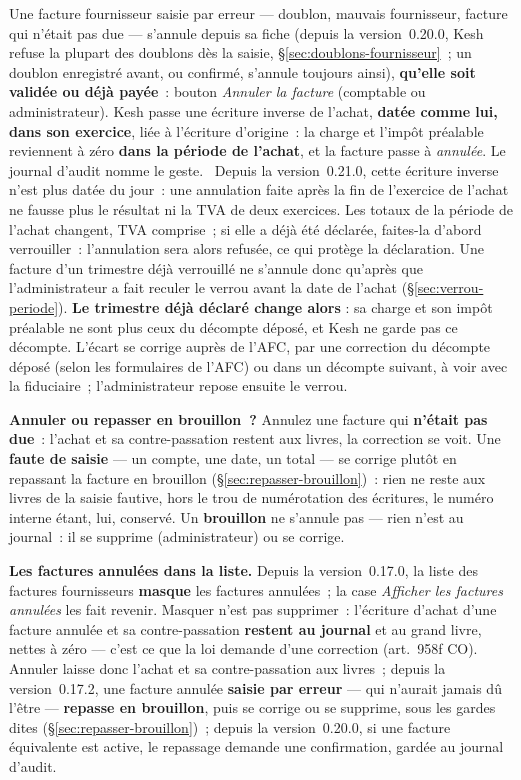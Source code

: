 \documentclass[a4paper,11pt,oneside]{article}
\begin{document}
Une facture fournisseur saisie par erreur --- doublon, mauvais fournisseur, facture qui n'était
pas due --- s'annule depuis sa fiche (depuis la version~0.20.0, Kesh refuse la plupart des
doublons dès la saisie, \S\ref{sec:doublons-fournisseur}~; un doublon enregistré avant, ou
confirmé, s'annule toujours ainsi), \textbf{qu'elle soit validée ou déjà payée}~: bouton
\emph{Annuler la facture} (comptable ou administrateur). Kesh passe une écriture inverse de
l'achat, \textbf{datée comme lui, dans son exercice}, liée à l'écriture d'origine~: la charge et
l'impôt préalable reviennent à zéro \textbf{dans la période de l'achat}, et la facture passe à
\emph{annulée}. Le journal d'audit nomme le geste. \keshAttention\ Depuis la version~0.21.0, cette
écriture inverse n'est plus datée du jour~: une annulation faite après la fin de l'exercice de
l'achat ne fausse plus le résultat ni la TVA de deux exercices. Les totaux de la période de l'achat
changent, TVA comprise~; si elle a déjà été déclarée, faites-la d'abord verrouiller~: l'annulation
sera alors refusée, ce qui protège la déclaration. Une facture d'un trimestre déjà verrouillé ne
s'annule donc qu'après que l'administrateur a fait reculer le verrou avant la date de l'achat
(\S\ref{sec:verrou-periode}). \textbf{Le trimestre déjà déclaré change alors} : sa charge et son
impôt préalable ne sont plus ceux du décompte déposé, et Kesh ne garde pas ce décompte. L'écart se
corrige auprès de l'AFC, par une correction du décompte déposé (selon les formulaires de l'AFC) ou dans un décompte suivant, à voir avec la
fiduciaire~; l'administrateur repose ensuite le verrou.

\textbf{Annuler ou repasser en brouillon~?} Annulez une facture qui \textbf{n'était pas due}~:
l'achat et sa contre-passation restent aux livres, la correction se voit. Une \textbf{faute de
saisie} --- un compte, une date, un total --- se corrige plutôt en repassant la facture en
brouillon (\S\ref{sec:repasser-brouillon})~: rien ne reste aux livres de la saisie fautive, hors
le trou de numérotation des écritures, le numéro interne étant, lui, conservé. Un \textbf{brouillon} ne s'annule pas --- rien n'est au journal~: il se
supprime (administrateur) ou se corrige.

\textbf{Les factures annulées dans la liste.} Depuis la version~0.17.0, la liste des factures
fournisseurs \textbf{masque} les factures annulées~; la case \emph{Afficher les factures annulées}
les fait revenir. Masquer n'est pas supprimer~: l'écriture d'achat d'une facture annulée et sa
contre-passation \textbf{restent au journal} et au grand livre, nettes à zéro --- c'est ce que la
loi demande d'une correction (art.~958f CO). Annuler laisse donc l'achat et sa contre-passation
aux livres~; depuis la version~0.17.2, une facture annulée \textbf{saisie par erreur} --- qui
n'aurait jamais dû l'être --- \textbf{repasse en brouillon}, puis se corrige ou se supprime,
sous les gardes dites (\S\ref{sec:repasser-brouillon})~; depuis la version~0.20.0, si une
facture équivalente est active, le repassage demande une confirmation, gardée au journal
d'audit.
\end{document}
